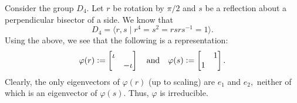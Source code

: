 \begin{ex} \label{ex:D4irreddeg2}
	Consider the group $D_4.$ Let $r$ be rotation by $\pi/2$ and $s$ be a reflection about a perpendicular bisector of a side. We know that
	\begin{equation*} 
		D_4 = \langle r, s \mid r^4 = s^2 = rsrs^{-1} = 1\rangle.
	\end{equation*}
	Using the above, we see that the following is a representation:
	\begin{equation*} 
		\varphi(r) \vcentcolon= \begin{bmatrix} \iota &  \\  & -\iota \end{bmatrix} \quad\text{and}\quad \varphi(s) \vcentcolon= \begin{bmatrix}  & 1 \\ 1 &  \end{bmatrix}.
	\end{equation*}
	Clearly, the only eigenvectors of $\varphi(r)$ (up to scaling) are $e_1$ and $e_2,$ neither of which is an eigenvector of $\varphi(s).$ Thus, $\varphi$ is irreducible.
\end{ex}

